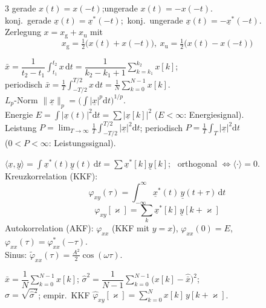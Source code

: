 \begin{multicols}{3}
gerade $x(t)=x(-t)$;\quad ungerade $x(t)=-x(-t)$.\\
konj.\ gerade $\underline x(t)=\underline x^{*}(-t)$;\ konj.\ ungerade $\underline x(t)=-\underline x^{*}(-t)$.\\
Zerlegung $x=x_{\mathrm g}+x_{\mathrm u}$ mit
\[ x_{\mathrm g}=\tfrac12\big(x(t)+x(-t)\big),\ x_{\mathrm u}=\tfrac12\big(x(t)-x(-t)\big) \]

$\bar x=\dfrac{1}{t_2-t_1}\!\int_{t_1}^{t_2}\! x\,\mathrm dt=\dfrac{1}{k_2-k_1+1}\!\displaystyle\sum_{k=k_1}^{k_2}\! x[k]$;\\
periodisch $\bar x=\tfrac1T\!\int_{-T/2}^{T/2}\! x\,\mathrm dt=\tfrac1N\!\sum_{k=0}^{N-1}\! x[k]$.\\
$L_p$-Norm $\|\underline x\|_p=\big(\int|\underline x|^p\mathrm dt\big)^{1/p}$.\\
Energie $E=\int|\underline x(t)|^2\mathrm dt=\sum|\underline x[k]|^2$ ($E<\infty$: Energiesignal).\\
Leistung $P=\lim_{T\to\infty}\tfrac1T\!\int_{-T/2}^{T/2}\!|\underline x|^2\mathrm dt$;\;
periodisch $P=\tfrac1T\!\int_T\!|\underline x|^2\mathrm dt$\\
($0<P<\infty$: Leistungssignal).

$\langle \underline x,\underline y\rangle=\int \underline x^{*}(t)\underline y(t)\,\mathrm dt=\sum \underline x^{*}[k]\underline y[k]$; \ orthogonal $\Leftrightarrow \langle\cdot\rangle=0$.\\
Kreuzkorrelation (KKF):
\[ \varphi_{xy}(\tau)=\!\int_{-\infty}^{\infty}\!\underline x^{*}(t)\,\underline y(t+\tau)\,\mathrm dt \]
\[ \varphi_{xy}[\varkappa]=\sum_{k}\underline x^{*}[k]\,\underline y[k+\varkappa] \]
Autokorrelation (AKF): $\varphi_{xx}$ (KKF mit $y=x$),
$\varphi_{xx}(0)=E$, $\varphi_{xx}(\tau)=\varphi_{xx}^{*}(-\tau)$.\\
Sinus: $\tilde\varphi_{xx}(\tau)=\tfrac{A^2}{2}\cos(\omega\tau)$.

$\hat{\bar x}=\dfrac1N\displaystyle\sum_{k=0}^{N-1}\! x[k]$;\quad
$\hat\sigma^2=\dfrac{1}{N-1}\displaystyle\sum_{k=0}^{N-1}\!\big(x[k]-\hat{\bar x}\big)^2$;\\
$\hat\sigma=\sqrt{\hat\sigma^2}$;\quad
empir.\ KKF $\hat\varphi_{xy}[\varkappa]=\sum_{k=0}^{N} x[k]\,y[k+\varkappa]$.


\end{multicols}
